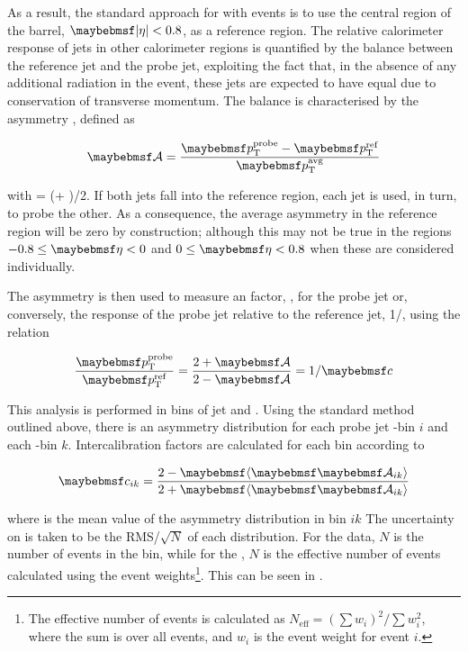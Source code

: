 As a result, the standard approach for \etaint with \dijet events is to use the
central region of the barrel, $\absEta < 0.8$, as a reference region.
The relative calorimeter response of jets in other calorimeter regions is
quantified by the \pT balance between the reference jet and the probe jet,
exploiting the fact that, in the absence of any additional radiation in the
event, these jets are expected to have equal \pT due to conservation of
transverse momentum. The \pT balance is characterised by the asymmetry
\Asymmetry, defined as

\begin{equation}
  \Asymmetry = \frac{\pTprobe - \pTref}{\pTavg}
\end{equation}

\noindent with \pTavg = (\pTprobe + \pTref)/2. If both jets fall into the
reference region, each jet is used, in turn, to probe the other. As a
consequence, the average asymmetry in the reference region will be zero by
construction; although this may not be true in the regions $-0.8 \leq \pseudorap < 0$
and $0 \leq \pseudorap < 0.8$ when these are considered individually.

The asymmetry is then used to measure an \etaint factor, \relResponse, for the
probe jet or, conversely, the response of the probe jet relative to the
reference jet, 1/\relResponse, using the relation

\begin{equation}
  \frac{\pTprobe}{\pTref} = \frac{2 + \Asymmetry}{2 - \Asymmetry} = 1 / \relResponse 
\end{equation}

This analysis is performed in bins of jet \pseudorap and \pTavg. Using the
standard method outlined above, there is an asymmetry distribution \Aik for each
probe jet \pseudorap-bin $i$ and each \pTavg-bin $k$. Intercalibration factors
are calculated for each bin according to 

\begin{equation}
  \relResponse_{ik} = \frac{2 - \angles{\Aik}}{2 + \angles{\Aik}} \label{eq:etaint:RelResponseRelation}
\end{equation}

where \angles{\Aik} is the mean value of the asymmetry distribution in bin $ik$
The uncertainty on \angles{\Aik} is taken to be the RMS/$\sqrt{N}$ of each
distribution. For the data, $N$ is the number of events in the bin, while for
the \MC, $N$ is the effective number of events calculated using the \MC event
weights\footnote{The effective number of events is calculated as
$N_\mathrm{eff} = (\sum{w_i})^2 /\sum{w_i^2}$, where the sum is over all events,
and $w_i$ is the event weight for event $i$.}. This can be seen in
.

